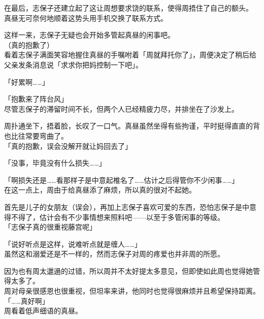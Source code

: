 在最后，志保子还建立起了这让周想要求饶的联系，使得周捂住了自己的额头。\\

真昼无可奈何地顺着这势头用手机交换了联系方式。

这样一来，志保子无疑也会开始多管起真昼的闲事吧。\\

（真的抱歉了）\\

看着志保子满面笑容地握住真昼的手嘱咐着「周就拜托你了」，周便决定了稍后给父亲发条消息说「求求你把妈控制一下吧」。\\

\vspace{2\baselineskip}

「好累啊……」

「抱歉来了阵台风」\\

尽管志保子的滞留时间不长，但两个人已经精疲力尽，并排坐在了沙发上。

周扑通坐下，捂着脸，长叹了一口气。真昼虽然坐得有些拘谨，平时挺得直直的背也比往常要弯曲了。\\

「真的抱歉，误会没解开就让妈回去了」

「没事，毕竟没有什么损失……」

「啊损失还是……看那样子是中意起椎名了……估计之后得管你不少闲事……」\\

在这一点上，周由于给真昼添了麻烦，所以真的很对不起她。

首先是儿子的女朋友（误会），再加上志保子喜欢可爱的东西，恐怕志保子是中意得不得了，估计会有不少事情想来照料吧——以至于多管闲事的等级。\\

「志保子真的很重视藤宫呢」

「说好听点是这样，说难听点就是缠人……」\\

虽然这和溺爱还是不一样的，然而志保子对周的疼爱也并非周的所愿。

因为也有周太邋遢的过错，所以周并不太好提太多意见，但即使如此周也觉得她管得太多了。\\

周对母亲很感恩也很重视，但坦率来讲，他同时也觉得很麻烦并且希望保持距离。\\

「……真好啊」\\

周看着低声细语的真昼。\\


